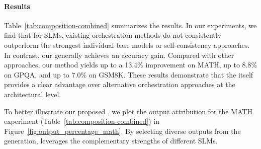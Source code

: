 

\paragraph{Results} Table~\ref{tab:composition-combined} summarizes the results. In our experiments, we find that for SLMs, existing orchestration methods do not consistently outperform the strongest individual base models or self-consistency approaches. In contrast, our \NAME{} generally achieves an accuracy gain. Compared with other approaches, our method yields up to a 13.4\% improvement on MATH, up to 8.8\% on GPQA, and up to 7.0\% on GSM8K.  These results demonstrate that the \NAME{} itself provides a clear advantage over alternative orchestration approaches at the architectural level. 

To better illustrate our proposed \NAME{}, we plot the output attribution for the MATH experiment (Table~\ref{tab:composition-combined}) in Figure~\ref{fig:output_percentage_math}. By selecting diverse outputs from the generation, \NAME{} leverages the complementary strengths of different SLMs.





